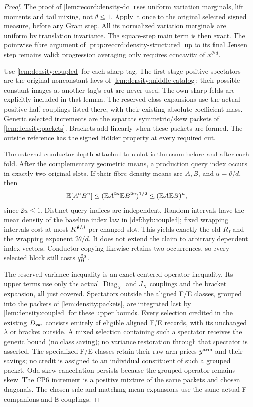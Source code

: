 \begin{proof}
The proof of \cref{lem:record:density-dc} uses uniform variation
marginals, lift moments and tail mixing, not $\theta\le1$. Apply it
once to the original selected signed measure, before any Gram step.
All its normalized variation marginals are uniform by translation
invariance. The square-step main term is then exact. The pointwise
fibre argument of \cref{prop:record:density-structured} up to its final
Jensen step remains valid: progression averaging only requires
concavity of $x^{\theta/d}$.

Use \cref{lem:density:coupled} for each sharp tag. The first-stage
positive spectators are the original nonconstant laws of
\cref{lem:density:middle-catalog}; their possible constant images at
another tag's cut are never used. The own sharp folds are explicitly
included in that lemma. The reserved class expansions use the actual
positive half couplings listed there, with their existing absolute
coefficient mass. Generic selected increments are the separate
symmetric/skew packets of \cref{lem:density:packets}. Brackets add
linearly when these packets are formed. The outside reference has
the signed H\"older property at every required cut.

The external conductor depth attached to a slot is the same before and after each fold. After the
complementary geometric means, a production query index occurs in
exactly two original slots. If their fibre-density means are $A,B$,
and $u=\theta/d$, then
\[
 \mathbb E[A^uB^u]\le(\mathbb E A^{2u}\mathbb E B^{2u})^{1/2}
       \le(\mathbb E A\mathbb E B)^u,
\]
since $2u\le1$. Distinct query indices are independent. Random intervals have the mean density of the baseline index law in \cref{def:hyb:coupled}; fixed wrapping intervals cost at most
$K^{\theta/d}$ per changed slot. This yields exactly the old
$R_I$ and the wrapping exponent $2\theta/d$. It does not extend the
claim to arbitrary dependent index vectors. Conductor copying likewise
retains two occurrences, so every selected block still costs $q_\mathcal B^{2a}$.

The reserved variance inequality is an exact centered operator
inequality. Its upper terms use only the actual $\operatorname{Diag}_X$
and $J_X$ couplings and the bracket expansion, all just covered.
Spectators outside the aligned F/E classes, grouped into the
packets of \cref{lem:density:packets}, are integrated last by
\cref{lem:density:coupled} for these upper bounds. Every
selection credited in the existing $D_{\rm var}$ consists
entirely of eligible aligned F/E records, with its unchanged
$\lambda$ or bracket outside. A mixed selection containing such
a spectator receives the generic bound (no class saving); no
variance restoration through that spectator is asserted.
The specialized F/E classes retain their raw-arm prices $y^{\rm arm}$ and their savings; no credit is assigned to an individual constituent of such a grouped packet.
Odd-skew cancellation persists because the grouped
operator remains skew. The CP6 increment is a positive mixture of the
same packets and chosen diagonals. The chosen-side and matching-mean
expansions use the same actual F companions and E couplings.


\end{proof}
